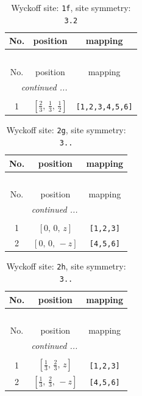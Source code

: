 \documentclass[fleqn,8pt]{jsarticle}
\begin{document}
\renewcommand{\arraystretch}{1.2}
\begin{longtable}{ccc}
\caption{Wyckoff site: {\tt 1f}, site symmetry: {\tt 3.2}}
 \\
 \hline \hline
No. & position & mapping \\ \hline \endfirsthead

\multicolumn{2}{l}{\tablename\ \thetable{}} \\
 \hline \hline
No. & position & mapping \\ \hline \endhead

 \hline \hline
\multicolumn{2}{r}{\footnotesize\it continued ...} \\ \endfoot

 \hline \hline
\multicolumn{2}{r}{} \\ \endlastfoot

1 & $\left[ \frac{2}{3},\, \frac{1}{3},\, \frac{1}{2} \right]$ & {\tt [1,2,3,4,5,6]} \\
\end{longtable}
\renewcommand{\arraystretch}{1.2}
\begin{longtable}{ccc}
\caption{Wyckoff site: {\tt 2g}, site symmetry: {\tt 3..}}
 \\
 \hline \hline
No. & position & mapping \\ \hline \endfirsthead

\multicolumn{2}{l}{\tablename\ \thetable{}} \\
 \hline \hline
No. & position & mapping \\ \hline \endhead

 \hline \hline
\multicolumn{2}{r}{\footnotesize\it continued ...} \\ \endfoot

 \hline \hline
\multicolumn{2}{r}{} \\ \endlastfoot

1 & $\left[ 0,\, 0,\, z \right]$ & {\tt [1,2,3]} \\ \hline
2 & $\left[ 0,\, 0,\, - z \right]$ & {\tt [4,5,6]} \\
\end{longtable}
\renewcommand{\arraystretch}{1.2}
\begin{longtable}{ccc}
\caption{Wyckoff site: {\tt 2h}, site symmetry: {\tt 3..}}
 \\
 \hline \hline
No. & position & mapping \\ \hline \endfirsthead

\multicolumn{2}{l}{\tablename\ \thetable{}} \\
 \hline \hline
No. & position & mapping \\ \hline \endhead

 \hline \hline
\multicolumn{2}{r}{\footnotesize\it continued ...} \\ \endfoot

 \hline \hline
\multicolumn{2}{r}{} \\ \endlastfoot

1 & $\left[ \frac{1}{3},\, \frac{2}{3},\, z \right]$ & {\tt [1,2,3]} \\ \hline
2 & $\left[ \frac{1}{3},\, \frac{2}{3},\, - z \right]$ & {\tt [4,5,6]} \\
\end{longtable}
\end{document}
